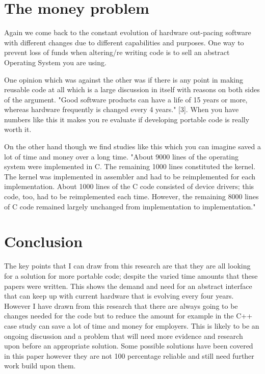 \documentclass{scrartcl}
\begin{document}
\section{The money problem}

Again we come back to the constant evolution of hardware out-pacing software with different changes due to different capabilities and purposes. One way to prevent loss of funds when altering/re writing code is to sell an abstract Operating System you are using.  

One opinion which was against the other was if there is any point in making reusable code at all which is a large discussion in itself with reasons on both sides of the argument. "Good software products can have a life of 15 years or more, whereas hardware frequently is changed every 4 years." [3]. When you have numbers like this it makes you re evaluate if developing portable code is really worth it. 

On the other hand though we find studies like this which you can imagine saved a lot of time and money over a long time. "About 9000 lines of the operating system were implemented in C. The remaining 1000 lines constituted the kernel. The kernel was implemented in assembler and had to be reimplemented for each implementation. About 1000 lines of the C code consisted of device drivers; this code, too, had to be reimplemented each time. However, the remaining 8000 lines of C code remained largely unchanged from implementation to implementation."

\section{Conclusion}
The key points that I can draw from this research are that they are all looking for a solution for more portable code; despite the varied time amounts that these papers were written. This shows the demand and need for an abstract interface that can keep up with current hardware that is evolving every four years. However I have drawn from this research that there are always going to be changes needed for the code but to reduce the amount for example in the C++ case study can save a lot of time and money for employers. 
This is likely to be an ongoing discussion and a problem that will need more evidence and research upon before an appropriate solution. Some possible solutions have been covered in this paper however they are not 100 percentage reliable and still need further work build upon them. 
\end{document}
